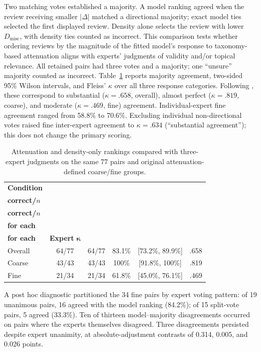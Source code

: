 \documentclass[fleqn,10pt]{JLA_article}
\let\cite\shortcite
\begin{document}
Two matching votes established a majority. A model ranking agreed when the review receiving smaller $|\Delta|$ matched a directional majority; exact model ties selected the first displayed review. Density alone selects the review with lower $D_{\text{misc}}$, with density ties counted as incorrect. This comparison tests whether ordering reviews by the magnitude of the fitted model's response to taxonomy-based attenuation aligns with experts' judgments of validity and/or topical relevance. All retained pairs had three votes and a majority; one ``unsure'' majority counted as incorrect. Table~\ref{tab:expert-consensus} reports majority agreement, two-sided 95\% Wilson \citeyear{Wilson1927} intervals, and Fleiss' \citeyear{Fleiss1971} $\kappa$ over all three response categories. Following \cite{Landis1977}, these correspond to substantial ($\kappa=.658$, overall), almost perfect ($\kappa=.819$, coarse), and moderate ($\kappa=.469$, fine) agreement. Individual-expert fine agreement ranged from 58.8\% to 70.6\%. Excluding individual non-directional votes raised fine inter-expert agreement to $\kappa=.634$ (``substantial agreement''); this does not change the primary scoring.

\begin{table}[htbp]
\centering
\small
\caption{Attenuation and density-only rankings compared with three-expert judgments on the same 77 pairs and original attenuation-defined coarse/fine groups.}
\label{tab:expert-consensus}
\begin{tabular}{lccccc}
\toprule
\textbf{Condition} & \shortstack{\textbf{Attenuation}\\\textbf{correct/$n$}} & \shortstack{\textbf{Density-only}\\\textbf{correct/$n$}} & \shortstack{\textbf{Agreement}\\\textbf{for each}} & \shortstack{\textbf{95\% CI}\\\textbf{for each}} & \textbf{Expert} $\boldsymbol{\kappa}$ \\
\midrule
Overall & 64/77 & 64/77 & 83.1\% & [73.2\%, 89.9\%] & .658 \\
Coarse  & 43/43 & 43/43 & 100\%  & [91.8\%, 100\%]  & .819 \\
Fine    & 21/34 & 21/34 & 61.8\% & [45.0\%, 76.1\%] & .469 \\
\bottomrule
\end{tabular}
\end{table}

A post hoc diagnostic partitioned the 34 fine pairs by expert voting pattern: of 19 unanimous pairs, 16 agreed with the model ranking (84.2\%); of 15 split-vote pairs, 5 agreed (33.3\%). Ten of thirteen model--majority disagreements occurred on pairs where the experts themselves disagreed. Three disagreements persisted despite expert unanimity, at absolute-adjustment contrasts of 0.314, 0.005, and 0.026 points.
\end{document}
